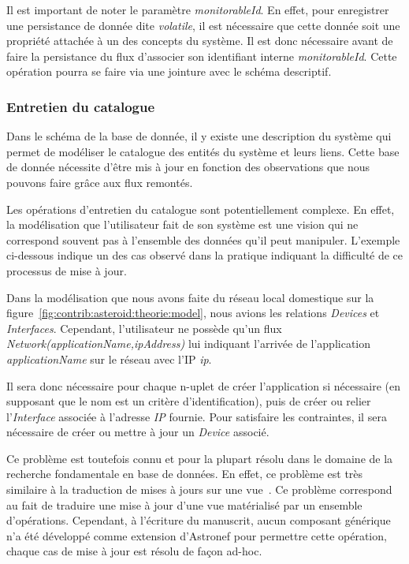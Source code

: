 Il est important de noter le paramètre \textit{monitorableId}. En effet, pour enregistrer une persistance de donnée dite \textit{volatile}, il est nécessaire que cette donnée soit une propriété attachée à un des concepts du système. Il est donc nécessaire avant de faire la persistance du flux d'associer son identifiant interne \textit{monitorableId}. Cette opération pourra se faire via une jointure avec le schéma descriptif.

\subsubsection{Entretien du catalogue}
Dans le schéma de la base de donnée, il y existe une description du système qui permet de modéliser le catalogue des entités du système et leurs liens. Cette base de donnée nécessite d'être mis à jour en fonction des observations que nous pouvons faire grâce aux flux remontés.

Les opérations d'entretien du catalogue sont potentiellement complexe. En effet, la modélisation que l'utilisateur fait de son système est une vision qui ne correspond souvent pas à l'ensemble des données qu'il peut manipuler. L'exemple ci-dessous indique un des cas observé dans la pratique indiquant la difficulté de ce processus de mise à jour.

\begin{example}
Dans la modélisation que nous avons faite du réseau local domestique sur la figure~\ref{fig:contrib:asteroid:theorie:model}, nous avions les relations \textit{Devices} et \textit{Interfaces}. Cependant, l'utilisateur ne possède qu'un flux \textit{Network(applicationName,ipAddress)} lui indiquant l'arrivée de l'application \textit{applicationName} sur le réseau avec l'IP \textit{ip}.

Il sera donc nécessaire pour chaque n-uplet de créer l'application si nécessaire (en supposant que le nom est un critère d'identification), puis de créer ou relier l'\textit{Interface} associée à l'adresse \textit{IP} fournie. Pour satisfaire les contraintes, il sera nécessaire de créer ou mettre à jour un \textit{Device} associé.
\end{example}

Ce problème est toutefois connu et pour la plupart résolu dans le domaine de la recherche fondamentale en base de données. En effet, ce problème est très similaire à  la traduction de mises à jours sur une vue~\cite{Keller:viewupdate}. Ce problème correspond au fait de traduire une mise à jour d'une vue matérialisé par un ensemble d'opérations. Cependant, à l'écriture du manuscrit, aucun composant générique n'a été développé comme extension d'Astronef pour permettre cette opération, chaque cas de mise à jour est résolu de façon ad-hoc.
